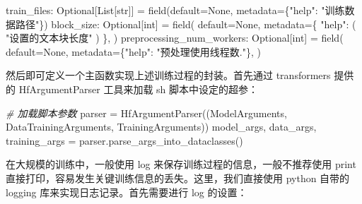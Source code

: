 \documentclass[
]{article}
\newenvironment{Shaded}{}{}
\newcommand{\BuiltInTok}[1]{\textcolor[rgb]{0.00,0.50,0.00}{#1}}
\newcommand{\CommentTok}[1]{\textcolor[rgb]{0.38,0.63,0.69}{\textit{#1}}}
\newcommand{\NormalTok}[1]{#1}
\newcommand{\OperatorTok}[1]{\textcolor[rgb]{0.40,0.40,0.40}{#1}}
\newcommand{\StringTok}[1]{\textcolor[rgb]{0.25,0.44,0.63}{#1}}
\newcommand{\VariableTok}[1]{\textcolor[rgb]{0.10,0.09,0.49}{#1}}
\begin{document}
\begin{Shaded}
\begin{Highlighting}[]
\NormalTok{    train\_files: Optional[List[}\BuiltInTok{str}\NormalTok{]]  }\OperatorTok{=}\NormalTok{ field(default}\OperatorTok{=}\VariableTok{None}\NormalTok{, metadata}\OperatorTok{=}\NormalTok{\{}\StringTok{"help"}\NormalTok{: }\StringTok{"训练数据路径"}\NormalTok{\})}
\NormalTok{    block\_size: Optional[}\BuiltInTok{int}\NormalTok{] }\OperatorTok{=}\NormalTok{ field(}
\NormalTok{        default}\OperatorTok{=}\VariableTok{None}\NormalTok{,}
\NormalTok{        metadata}\OperatorTok{=}\NormalTok{\{}
            \StringTok{"help"}\NormalTok{: (}
                \StringTok{"设置的文本块长度"}
\NormalTok{            )}
\NormalTok{        \},}
\NormalTok{    )}
\NormalTok{    preprocessing\_num\_workers: Optional[}\BuiltInTok{int}\NormalTok{] }\OperatorTok{=}\NormalTok{ field(}
\NormalTok{        default}\OperatorTok{=}\VariableTok{None}\NormalTok{,}
\NormalTok{        metadata}\OperatorTok{=}\NormalTok{\{}\StringTok{"help"}\NormalTok{: }\StringTok{"预处理使用线程数."}\NormalTok{\},}
\NormalTok{    )}
\end{Highlighting}
\end{Shaded}

然后即可定义一个主函数实现上述训练过程的封装。首先通过 transformers
提供的 HfArgumentParser 工具来加载 sh 脚本中设定的超参：

\begin{Shaded}
\begin{Highlighting}[]
\CommentTok{\# 加载脚本参数}
\NormalTok{parser }\OperatorTok{=}\NormalTok{ HfArgumentParser((ModelArguments, DataTrainingArguments, TrainingArguments))}
\NormalTok{model\_args, data\_args, training\_args }\OperatorTok{=}\NormalTok{ parser.parse\_args\_into\_dataclasses()}
\end{Highlighting}
\end{Shaded}

在大规模的训练中，一般使用 log 来保存训练过程的信息，一般不推荐使用
print 直接打印，容易发生关键训练信息的丢失。这里，我们直接使用 python
自带的 logging 库来实现日志记录。首先需要进行 log 的设置：
\end{document}

